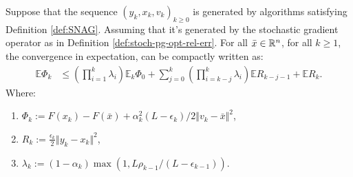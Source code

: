 \documentclass[12pt]{article}
\newcommand{\expect}{\ensuremath{\mathbb E}}
\begin{document}
        \begin{theorem}\label{thm:snag-convergence}
            Suppose that the sequence $(y_k, x_k, v_k)_{k \ge 0}$ is generated by algorithms satisfying Definition \ref{def:SNAG}. 
            Assuming that it's generated by the stochastic gradient operator as in Definition \ref{def:stoch-pg-opt-rel-err}. 
            For all $\bar x \in \mathbb R^n$, for all $k \ge 1$, the convergence in expectation, can be compactly written as: 
            \begin{align*}
                \expect \Phi_k &\le
                \left(
                    \prod_{i = 1}^k \lambda_i
                \right)\expect_k \Phi_0 + 
                \sum_{j = 0}^{k}\left(
                    \prod_{i = k - j}^k \lambda_i
                \right)\expect R_{k - j - 1}
                + \expect R_k.
            \end{align*}
            Where: 
            \begin{enumerate}[nosep]
                \item $\Phi_k := F(x_k) - F(\bar x) + \alpha_k^2(L - \epsilon_k)/2 \Vert v_k - \bar x\Vert^2$, 
                \item $R_k := \frac{\epsilon_k}{2}\Vert y_k - x_k\Vert^2$, 
                \item $\lambda_k := (1 - \alpha_k)\max(1, L\rho_{k - 1}/(L - \epsilon_{k - 1}))$. 
            \end{enumerate}
        \end{theorem}
\end{document}
